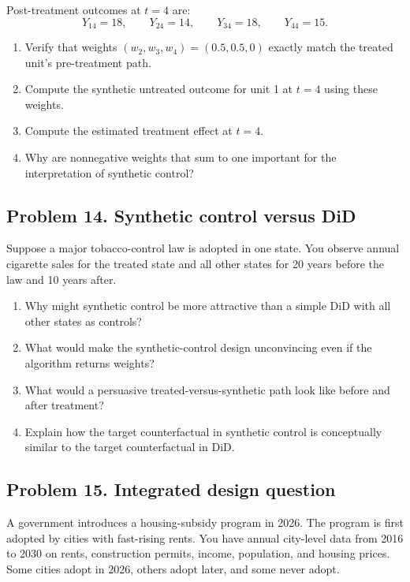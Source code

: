 \documentclass[11pt]{article}
\begin{document}
Post-treatment outcomes at $t=4$ are:
\[
Y_{14}=18,\qquad Y_{24}=14,\qquad Y_{34}=18,\qquad Y_{44}=15.
\]

\begin{enumerate}[label=(\alph*)]
\item Verify that weights $(w_2,w_3,w_4)=(0.5,0.5,0)$ exactly match the treated unit's pre-treatment path.
\item Compute the synthetic untreated outcome for unit 1 at $t=4$ using these weights.
\item Compute the estimated treatment effect at $t=4$.
\item Why are nonnegative weights that sum to one important for the interpretation of synthetic control?
\end{enumerate}

\subsection*{Problem 14. Synthetic control versus DiD}

Suppose a major tobacco-control law is adopted in one state. You observe annual cigarette sales for the treated state and all other states for 20 years before the law and 10 years after.

\begin{enumerate}[label=(\alph*)]
\item Why might synthetic control be more attractive than a simple DiD with all other states as controls?
\item What would make the synthetic-control design unconvincing even if the algorithm returns weights?
\item What would a persuasive treated-versus-synthetic path look like before and after treatment?
\item Explain how the target counterfactual in synthetic control is conceptually similar to the target counterfactual in DiD.
\end{enumerate}

\subsection*{Problem 15. Integrated design question}

A government introduces a housing-subsidy program in 2026. The program is first adopted by cities with fast-rising rents. You have annual city-level data from 2016 to 2030 on rents, construction permits, income, population, and housing prices. Some cities adopt in 2026, others adopt later, and some never adopt.
\end{document}
